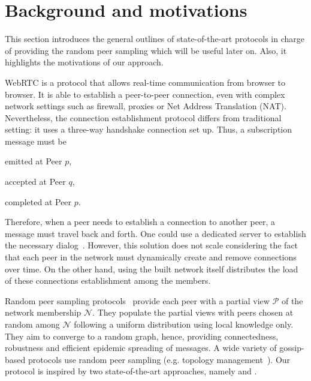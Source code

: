 
\section{Background and motivations}
\label{sec:background}

This section introduces the general outlines of state-of-the-art protocols in
charge of providing the random peer sampling which will be useful later
on. Also, it highlights the motivations of our approach.

\begin{asparadesc}
\item [WebRTC] is a protocol that allows real-time communication from browser
  to browser. It is able to establish a peer-to-peer connection, even with
  complex network settings such as firewall, proxies or Net Address Translation
  (NAT). Nevertheless, the connection establishment protocol differs from
  traditional setting: it uses a three-way handshake connection set up.  Thus,
  a subscription message must be
  \begin{inparaenum}[(1)]
  \item emitted at Peer $p$,
  \item accepted at Peer $q$,
  \item completed at Peer $p$.
  \end{inparaenum}
  Therefore, when a peer needs to establish a connection to another peer, a
  message must travel back and forth. One could use a dedicated server to
  establish the necessary dialog~\cite{peerjs}. However, this solution does not
  scale considering the fact that each peer in the network must dynamically
  create and remove connections over time. On the other hand, using the built
  network itself distributes the load of these connections establishment among
  the members.
\end{asparadesc}

\begin{asparadesc}
\item[Random peer sampling] protocols~\cite{jelasity2004peer} provide each peer
  with a partial view $\mathcal{P}$ of the network membership
  $\mathcal{N}$. They populate the partial views with peers chosen at random
  among $\mathcal{N}$ following a uniform distribution using local knowledge
  only. They aim to converge to a random graph, hence, providing connectedness,
  robustness and efficient epidemic spreading of messages. A wide variety of
  gossip-based protocols use random peer sampling (e.g. topology
  management~\cite{voulgaris2005epidemic,jelasity2009tman}).  Our \SCAMPLON{}
  protocol is inspired by two state-of-the-art approaches, namely \SCAMP{} and
  \CYCLON{}.
\end{asparadesc}

